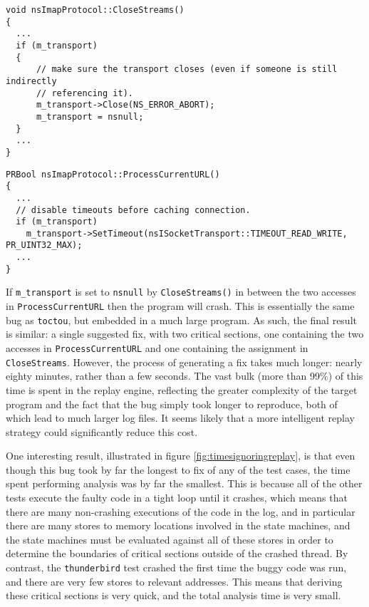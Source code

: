 \documentclass[10pt,twocolumn,preprint,natbib,authoryear]{sigplanconf}
\begin{document}
\begin{verbatim}
void nsImapProtocol::CloseStreams()
{
  ...
  if (m_transport)
  {
      // make sure the transport closes (even if someone is still indirectly
      // referencing it).
      m_transport->Close(NS_ERROR_ABORT);
      m_transport = nsnull;
  }
  ...
}
\end{verbatim}

\begin{verbatim}
PRBool nsImapProtocol::ProcessCurrentURL()
{
  ...
  // disable timeouts before caching connection.
  if (m_transport)
    m_transport->SetTimeout(nsISocketTransport::TIMEOUT_READ_WRITE, PR_UINT32_MAX);
  ...
}
\end{verbatim}

If \verb|m_transport| is set to \verb|nsnull| by \verb|CloseStreams()|
in between the two accesses in \verb|ProcessCurrentURL| then the
program will crash.  This is essentially the same bug as
\verb|toctou|, but embedded in a much large program.  As such, the
final result is similar: a single suggested fix, with two critical
sections, one containing the two accesses in \verb|ProcessCurrentURL|
and one containing the assignment in \verb|CloseStreams|.  However,
the process of generating a fix takes much longer: nearly eighty
minutes, rather than a few seconds.  The vast bulk (more than 99\%) of
this time is spent in the replay engine, reflecting the greater
complexity of the target program and the fact that the bug simply took
longer to reproduce, both of which lead to much larger log files.  It
seems likely that a more intelligent replay strategy could
significantly reduce this cost.

One interesting result, illustrated in figure
\ref{fig:timesignoringreplay}, is that even though this bug took by
far the longest to fix of any of the test cases, the time spent
performing analysis was by far the smallest.  This is because all of
the other tests execute the faulty code in a tight loop until it
crashes, which means that there are many non-crashing executions of
the code in the log, and in particular there are many stores to memory
locations involved in the state machines, and the state machines must
be evaluated against all of these stores in order to determine the
boundaries of critical sections outside of the crashed thread.  By
contrast, the \verb|thunderbird| test crashed the first time the buggy
code was run, and there are very few stores to relevant addresses.
This means that deriving these critical sections is very quick, and
the total analysis time is very small.
\end{document}
